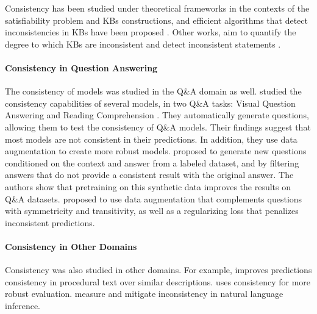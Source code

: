 Consistency has been studied under theoretical frameworks in the contexts of the satisfiability problem and KBs constructions, and efficient algorithms that detect inconsistencies in KBs have been proposed \cite{hansen2000probabilistic,andersen2001easy}.
Other works, aim to quantify the degree to which KBs are inconsistent and detect inconsistent statements \cite{Thimm:2009d,muino2011measuring,Thimm:2013}.



\paragraph{Consistency in Question Answering}
The consistency of models was studied in the Q\&A domain as well. \citet{ribeiro-etal-2019-red} studied the consistency capabilities of several models, in two Q\&A tasks: Visual Question Answering \cite{vqa} and Reading Comprehension \cite{squad}. They automatically generate questions, allowing them to test the consistency of Q\&A models.
Their findings suggest that most models are not consistent in their predictions. In addition, they use data augmentation to create more robust models.
\citet{alberti2019synthetic} proposed to generate new questions conditioned on the context and answer from a labeled dataset, and by filtering answers that do not provide a consistent result with the original answer. The authors show that pretraining on this synthetic data improves the results on Q\&A datasets.
\citet{consistent-qa} proposed to use data augmentation that complements questions with symmetricity and transitivity, as well as a regularizing loss that penalizes inconsistent predictions.

\paragraph{Consistency in Other Domains}
Consistency was also studied in other domains. For example, \citet{du2019consistent} improves predictions consistency in procedural text over similar descriptions. \citet{ribeiro-etal-2020-beyond} uses consistency for more robust evaluation. \citet{li-etal-2019-logic} measure and mitigate inconsistency in natural language inference.

